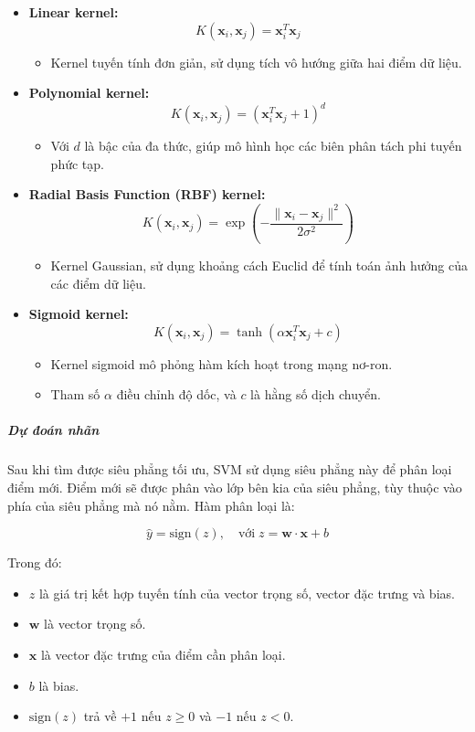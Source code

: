 \documentclass[a4paper,12pt]{article}
\begin{document}
\begin{itemize}
    \item \textbf{Linear kernel:}
    \[
    K(\mathbf{x}_i, \mathbf{x}_j) = \mathbf{x}_i^T \mathbf{x}_j
    \]
    \begin{itemize}
        \item Kernel tuyến tính đơn giản, sử dụng tích vô hướng giữa hai điểm dữ liệu.
    \end{itemize}
    \item \textbf{Polynomial kernel:}
    \[
    K(\mathbf{x}_i, \mathbf{x}_j) = (\mathbf{x}_i^T \mathbf{x}_j + 1)^d
    \]
    \begin{itemize}
        \item Với \(d\) là bậc của đa thức, giúp mô hình học các biên phân tách phi tuyến phức tạp.
    \end{itemize}
    \item \textbf{Radial Basis Function (RBF) kernel:}
    \[
    K(\mathbf{x}_i, \mathbf{x}_j) = \exp\left(-\frac{\|\mathbf{x}_i - \mathbf{x}_j\|^2}{2\sigma^2}\right)
    \]
    \begin{itemize}
        \item Kernel Gaussian, sử dụng khoảng cách Euclid để tính toán ảnh hưởng của các điểm dữ liệu.
    \end{itemize}
    \item \textbf{Sigmoid kernel:}
    \[
    K(\mathbf{x}_i, \mathbf{x}_j) = \tanh\left(\alpha \mathbf{x}_i^T \mathbf{x}_j + c\right)
    \]
    \begin{itemize}
        \item Kernel sigmoid mô phỏng hàm kích hoạt trong mạng nơ-ron.
        \item Tham số \(\alpha\) điều chỉnh độ dốc, và \(c\) là hằng số dịch chuyển.
    \end{itemize}
\end{itemize}


\subparagraph{Dự đoán nhãn}  
\hspace{5mm}Sau khi tìm được siêu phẳng tối ưu, SVM sử dụng siêu phẳng này để phân loại điểm mới. Điểm mới sẽ được phân vào lớp bên kia của siêu phẳng, tùy thuộc vào phía của siêu phẳng mà nó nằm. Hàm phân loại là:

\[
\hat{y} = \text{sign}(z), \quad \text{với} \; z = \mathbf{w} \cdot \mathbf{x} + b
\]

\noindent Trong đó:
\begin{itemize}
    \item \(z\) là giá trị kết hợp tuyến tính của vector trọng số, vector đặc trưng và bias.
    \item \(\mathbf{w}\) là vector trọng số.
    \item \(\mathbf{x}\) là vector đặc trưng của điểm cần phân loại.
    \item \(b\) là bias.
    \item \(\text{sign}(z)\) trả về \(+1\) nếu \(z \geq 0\) và \(-1\) nếu \(z < 0\).
\end{itemize}
\end{document}
